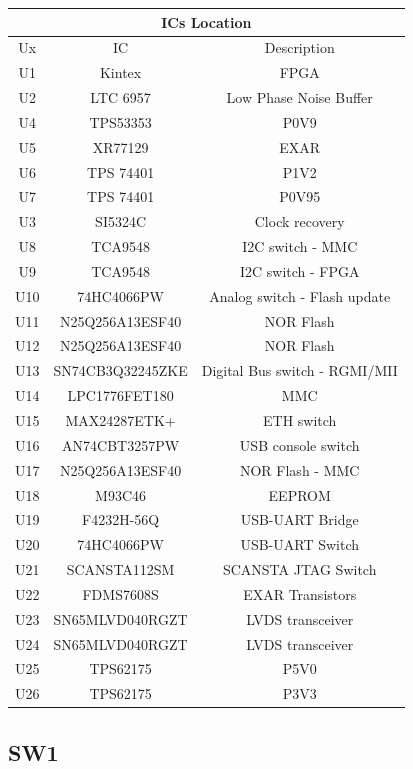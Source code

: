 \begin{longtable}{|c|c|c|} \hline
		\multicolumn{3}{|c|}{ICs Location}\\ \hline	
	Ux & IC & Description \\ \hline
	U1 & Kintex& FPGA \\ \hline
	U2 & LTC 6957&Low Phase Noise Buffer \\ \hline
	U4 & TPS53353  & P0V9\\ \hline
	U5 & XR77129 & EXAR\\ \hline
	U6 & TPS 74401  & P1V2\\ \hline
	U7 &  TPS 74401 & P0V95 \\ \hline
	U3 & SI5324C& Clock recovery \\ \hline
	U8 & TCA9548 &I2C switch - MMC\\ \hline
	U9 & TCA9548 &I2C switch - FPGA\\ \hline
	U10 & 74HC4066PW & Analog switch - Flash update\\ \hline
	U11 & N25Q256A13ESF40 & NOR Flash\\ \hline
	U12 & N25Q256A13ESF40 & NOR Flash\\ \hline
	U13 & SN74CB3Q32245ZKE  & Digital Bus switch - RGMI/MII\\ \hline
	U14 & LPC1776FET180  & MMC\\ \hline
	U15 & MAX24287ETK+ &ETH switch\\ \hline
	U16 & AN74CBT3257PW  & USB console switch\\ \hline
	U17 & N25Q256A13ESF40 & NOR Flash - MMC\\ \hline
	U18 & M93C46  & EEPROM\\ \hline
	U19 & F4232H-56Q & USB-UART Bridge \\ \hline
	U20 & 74HC4066PW & USB-UART Switch\\ \hline
	U21 & SCANSTA112SM & SCANSTA JTAG Switch\\ \hline
	U22 & FDMS7608S &EXAR Transistors \\ \hline
	U23 & SN65MLVD040RGZT &LVDS transceiver\\ \hline
	U24 & SN65MLVD040RGZT &LVDS transceiver \\ \hline
	U25 & TPS62175  & P5V0 \\ \hline
	U26 & TPS62175 & P3V3 \\ \hline
\end{longtable}


\subsection{SW1}

